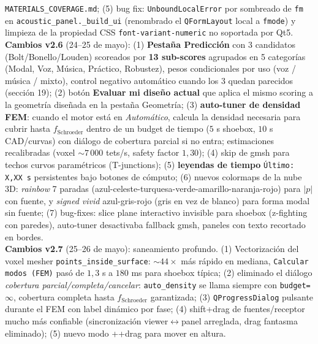 \documentclass[11pt, a4paper]{article}
\newcommand{\tecla}[1]{\texttt{\small\fbox{#1}}}
\newcommand{\menu}[1]{\textbf{\guillemotleft #1\guillemotright}}
\begin{document}
\begin{center}
{    \texttt{MATERIALS\_COVERAGE.md}; (5) bug fix: \texttt{UnboundLocalError}
    por sombreado de \texttt{fm} en \texttt{acoustic\_panel.\_build\_ui}
    (renombrado el \texttt{QFormLayout} local a \texttt{fmode}) y limpieza
    de la propiedad CSS \texttt{font-variant-numeric} no soportada
    por Qt5.\\[2pt]
    \textbf{Cambios v2.6} (24--25 de mayo):
    (1) \textbf{Pestaña Predicción} con 3 candidatos (Bolt/Bonello/Louden)
    scoreados por \textbf{13 sub-scores} agrupados en 5 categorías
    (Modal, Voz, Música, Práctico, Robustez), pesos condicionales por uso
    (voz / música / mixto), control negativo automático cuando los 3
    quedan parecidos (sección 19);
    (2) botón \menu{Evaluar mi diseño actual} que aplica el mismo scoring
    a la geometría diseñada en la pestaña Geometría;
    (3) \textbf{auto-tuner de densidad FEM}: cuando el motor está en
    \emph{Automático}, calcula la densidad necesaria para cubrir hasta
    $f_\text{Schroeder}$ dentro de un budget de tiempo
    ($5$ s shoebox, $10$ s CAD/curvas) con diálogo de cobertura parcial
    si no entra; estimaciones recalibradas (voxel $\sim 7\,000$ tets/s,
    safety factor $1{,}30$);
    (4) skip de gmsh para techos curvos paramétricos (T-junctions);
    (5) \textbf{leyendas de tiempo} \texttt{Último: X,XX s} persistentes
    bajo botones de cómputo;
    (6) nuevos colormaps de la nube 3D: \emph{rainbow} 7 paradas
    (azul-celeste-turquesa-verde-amarillo-naranja-rojo) para
    $|p|$ con fuente, y \emph{signed vivid} azul-gris-rojo (gris en vez
    de blanco) para forma modal sin fuente;
    (7) bug-fixes: slice plane interactivo invisible para shoebox
    (z-fighting con paredes), auto-tuner desactivaba fallback gmsh,
    paneles con texto recortado en bordes.\\[2pt]
    \textbf{Cambios v2.7} (25--26 de mayo): saneamiento profundo.
    (1) Vectorización del voxel mesher \texttt{points\_inside\_surface}:
    $\sim 44\times$ más rápido en mediana, \texttt{Calcular modos (FEM)}
    pasó de $1{,}3$ s a $180$ ms para shoebox típica;
    (2) eliminado el diálogo \emph{cobertura parcial/completa/cancelar}:
    \texttt{auto\_density} se llama siempre con \texttt{budget=}$\infty$,
    cobertura completa hasta $f_\text{Schroeder}$ garantizada;
    (3) \texttt{QProgressDialog} pulsante durante el FEM con label
    dinámico por fase;
    (4) shift+drag de fuentes/receptor mucho más confiable
    (sincronización viewer$\leftrightarrow$panel arreglada, drag fantasma
    eliminado);
    (5) nuevo modo \tecla{Ctrl}+\tecla{Shift}+drag para mover en altura.\\[2pt]
}
\end{center}
\end{document}
